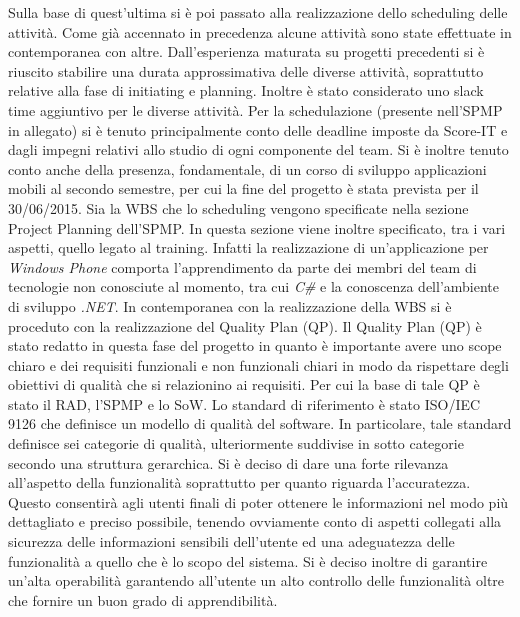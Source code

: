 Sulla base di quest\rq ultima si \`{e} poi passato alla realizzazione dello scheduling delle attivit\`{a}.
Come gi\`{a} accennato in precedenza alcune attivit\`{a} sono state effettuate in contemporanea con altre. Dall\rq esperienza maturata su progetti precedenti si \`{e} riuscito stabilire una durata approssimativa delle diverse attivit\`{a}, soprattutto relative alla fase di initiating e planning.
Inoltre \`{e} stato considerato uno slack time aggiuntivo per le diverse attivit\`{a}.
Per la schedulazione (presente nell\rq SPMP in allegato) si \`{e} tenuto principalmente conto delle deadline imposte da Score-IT e dagli impegni relativi allo studio di ogni componente del team.
Si \`{e} inoltre tenuto conto anche della presenza, fondamentale, di un corso di sviluppo applicazioni mobili al secondo semestre, per cui la fine del progetto \`{e} stata prevista per il 30/06/2015.
Sia la WBS che lo scheduling vengono specificate nella sezione Project Planning dell\rq SPMP. In questa sezione viene inoltre specificato, tra i vari aspetti, quello legato al training.
Infatti la realizzazione di un\rq applicazione per \emph{Windows Phone} comporta l\rq apprendimento da parte dei membri del team di tecnologie non conosciute al momento, tra cui \emph{C\#} e la conoscenza dell\rq ambiente di sviluppo \emph{.NET}. In contemporanea con la realizzazione della WBS si \`{e} proceduto con la realizzazione del Quality Plan (QP). Il Quality Plan (QP) \`{e} stato redatto in questa fase del progetto in quanto \`{e} importante avere uno scope chiaro e dei requisiti funzionali e non funzionali chiari in modo da rispettare degli obiettivi di qualit\`{a} che si relazionino ai requisiti. Per cui la base di tale QP \`{e} stato il RAD, l\rq SPMP e lo SoW.
Lo standard di riferimento \`{e} stato ISO/IEC 9126 che definisce un modello di qualit\`{a} del software. In particolare, tale standard definisce sei categorie di qualit\`{a}, ulteriormente suddivise in sotto categorie secondo una struttura gerarchica. Si \`{e} deciso di dare una forte rilevanza all\rq aspetto della funzionalit\`{a} soprattutto per quanto riguarda l\rq accuratezza.
Questo consentir\`{a} agli utenti finali di poter ottenere le informazioni nel modo pi\`{u} dettagliato e preciso possibile, tenendo ovviamente conto di aspetti collegati alla sicurezza delle informazioni sensibili dell\rq utente ed una adeguatezza delle funzionalit\`{a} a quello che \`{e} lo scopo del sistema.
Si \`{e} deciso inoltre di garantire un\rq alta operabilit\`{a} garantendo all\rq utente un alto controllo delle funzionalit\`{a} oltre che fornire un buon grado di apprendibilit\`{a}.
